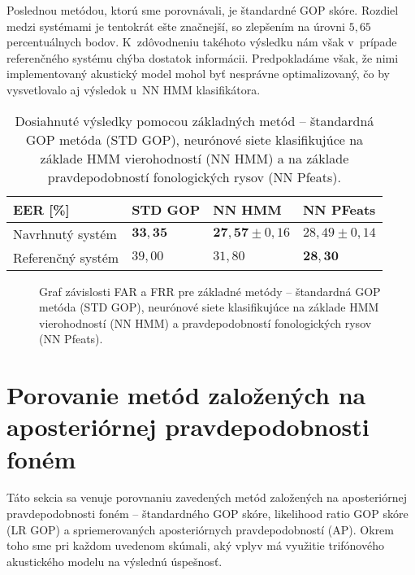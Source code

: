 Poslednou metódou, ktorú sme porovnávali, je štandardné GOP skóre. Rozdiel medzi systémami je tentokrát ešte značnejší, so zlepšením na úrovni $5{,}65$ percentuálnych bodov. K~zdôvodneniu takéhoto výsledku nám však v~prípade referenčného systému chýba dostatok informácii. Predpokladáme však, že nimi implementovaný akustický model mohol byť nesprávne optimalizovaný, čo by vysvetlovalo aj výsledok u~NN HMM klasifikátora.



\begin{table}[h!]
    \centering
    \begin{tabular}{@{}llll@{}}
    \toprule
    EER {[}\%{]}                       & STD GOP & NN HMM           & NN PFeats        \\ \midrule
    Navrhnutý systém                   & $\bm{33{,}35}$ & $\bm{27{,}57} \pm 0{,}16$ & $28{,}49 \pm 0{,}14$ \\
    Referenčný systém \cite{Arora2017} & $39{,}00$ & $31{,}80$          & $\bm{28{,}30}$          \\ \bottomrule
    \end{tabular}
    \caption{Dosiahnuté výsledky pomocou základných metód -- štandardná GOP metóda (STD GOP), neurónové siete klasifikujúce na základe HMM vierohodností (NN HMM) a na základe pravdepodobností fonologických rysov (NN Pfeats).} \label{tab:eer-basic-methods}
    \end{table}

\begin{figure}[h!]
    \centering
    
    \caption{Graf závislosti FAR a FRR pre základné metódy -- štandardná GOP metóda (STD GOP), neurónové siete klasifikujúce na základe HMM vierohodností (NN HMM) a pravdepodobností fonologických rysov (NN Pfeats).} \label{fig:roc-basic-methods}
\end{figure}


\section{Porovanie metód založených na aposteriórnej pravdepodobnosti foném}

Táto sekcia sa venuje porovnaniu zavedených metód založených na aposteriórnej pravdepodobnosti foném -- štandardného GOP skóre, likelihood ratio GOP skóre (LR GOP) a spriemerovaných aposteriórnych pravdepodobností (AP). Okrem toho sme pri každom uvedenom skúmali, aký vplyv má využitie trifónového akustického modelu na výslednú úspešnosť.

